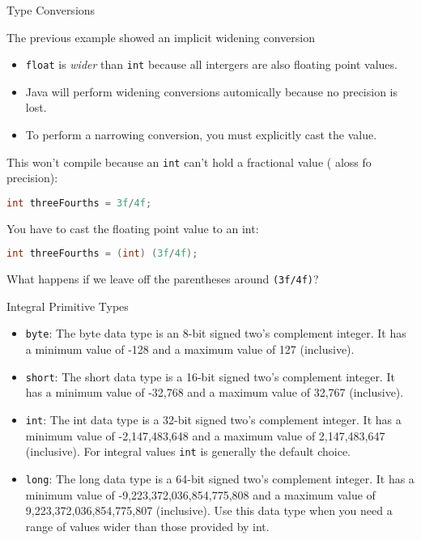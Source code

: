 \documentclass{beamer}
\begin{document}
\begin{frame}[fragile]{Type Conversions}


The previous example showed an implicit widening conversion
\begin{itemize}
\item {\tt float} is {\it wider} than {\tt int} because all intergers are also floating point values.
\item Java will perform widening conversions automically because no precision is lost.
\item To perform a narrowing conversion, you must explicitly cast the value.
\end{itemize}

This won't compile because an {\tt int} can't hold a fractional value ( aloss fo precision):
\begin{lstlisting}[language=Java]
int threeFourths = 3f/4f;
\end{lstlisting}

You have to cast the floating point value to an int:

\begin{lstlisting}[language=Java]
int threeFourths = (int) (3f/4f);
\end{lstlisting}

What happens if we leave off the parentheses around {\tt (3f/4f)}?


\end{frame}

\begin{frame}[fragile]{Integral Primitive Types}



\begin{itemize}
\item  {\tt byte}: The byte data type is an 8-bit signed two's complement integer. It has a minimum value of -128 and a maximum value of 127 (inclusive).

\item {\tt short}: The short data type is a 16-bit signed two's complement integer. It has a minimum value of -32,768 and a maximum value of 32,767 (inclusive). 

\item {\tt int}: The int data type is a 32-bit signed two's complement integer. It has a minimum value of -2,147,483,648 and a maximum value of 2,147,483,647 (inclusive). For integral values {\tt int} is generally the default choice.

\item {\tt long}: The long data type is a 64-bit signed two's complement integer. It has a minimum value of -9,223,372,036,854,775,808 and a maximum value of 9,223,372,036,854,775,807 (inclusive). Use this data type when you need a range of values wider than those provided by int.
\end{itemize}

\end{frame}
\end{document}
